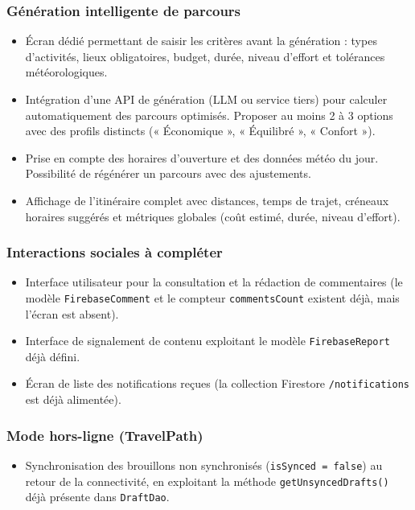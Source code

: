 \documentclass[a4paper, 12pt]{article}
\begin{document}
\begin{justify}
\subsubsection*{Génération intelligente de parcours}

\begin{itemize}
    \item Écran dédié permettant de saisir les critères avant la génération : types d'activités, lieux obligatoires, budget, durée, niveau d'effort et tolérances météorologiques.
    \item Intégration d'une API de génération (LLM ou service tiers) pour calculer automatiquement des parcours optimisés. Proposer au moins 2 à 3 options avec des profils distincts (« Économique », « Équilibré », « Confort »).
    \item Prise en compte des horaires d'ouverture et des données météo du jour. Possibilité de régénérer un parcours avec des ajustements.
    \item Affichage de l'itinéraire complet avec distances, temps de trajet, créneaux horaires suggérés et métriques globales (coût estimé, durée, niveau d'effort).
\end{itemize}

\subsubsection*{Interactions sociales à compléter}

\begin{itemize}
    \item Interface utilisateur pour la consultation et la rédaction de commentaires (le modèle \texttt{FirebaseComment} et le compteur \texttt{commentsCount} existent déjà, mais l'écran est absent).
    \item Interface de signalement de contenu exploitant le modèle \texttt{FirebaseReport} déjà défini.
    \item Écran de liste des notifications reçues (la collection Firestore \texttt{/\allowbreak{}notifications} est déjà alimentée).
\end{itemize}

\subsubsection*{Mode hors-ligne (TravelPath)}

\begin{itemize}
    \item Synchronisation des brouillons non synchronisés (\texttt{isSynced = false}) au retour de la connectivité, en exploitant la méthode \texttt{getUnsyncedDrafts()} déjà présente dans \texttt{DraftDao}.
\end{itemize}


\end{justify}
\end{document}
